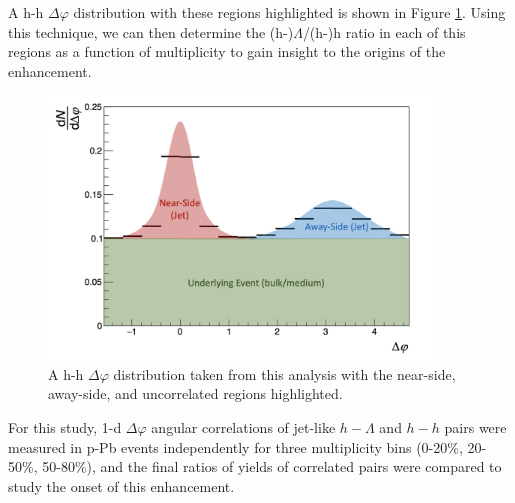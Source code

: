 A h-h $\Delta\varphi$ distribution with these regions highlighted is shown in Figure \ref{fig:dphi_regions}. Using this technique, we can then determine the (h-)$\Lambda$/(h-)h ratio in each of this regions as a function of multiplicity to gain insight to the origins of the enhancement.

\begin{figure}
\centering
\includegraphics[width=4in]{figures/analysis/dphi_regions.png}
\caption{A h-h $\Delta\varphi$ distribution taken from this analysis with the near-side, away-side, and uncorrelated regions highlighted.}
\label{fig:dphi_regions}
\end{figure}

For this study, 1-d $\Delta\varphi$ angular correlations of jet-like $h-\Lambda$ and $h-h$ pairs were measured in p-Pb events independently for three multiplicity bins (0-20\%, 20-50\%, 50-80\%), and the final ratios of yields of correlated pairs were compared to study the onset of this enhancement. 





